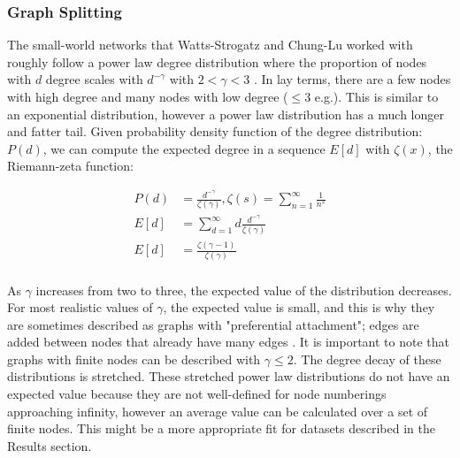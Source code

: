 \documentclass{article}
\begin{document}
\subsubsection{Graph Splitting}
The small-world networks that Watts-Strogatz and Chung-Lu worked with roughly follow a power law degree distribution where the proportion of nodes with $d$ degree scales with $d^{-\gamma}$ with $2 < \gamma < 3$ \cite{Chung:2004,Watts:1998}. In lay terms, there are a few nodes with high degree and many nodes with low degree ($\leq3$ e.g.). This is similar to an exponential distribution, however a power law distribution has a much longer and fatter tail. Given probability density function of the degree distribution: $P(d)$, we can compute the expected degree in a sequence $E[d]$ with $\zeta(x)$, the Riemann-zeta function:\\
\begin{spacing}{1}
\begin{align*}
P(d) & = \frac{d^{-\gamma}}{\zeta(\gamma)},               \zeta(s) = \sum_{n=1}^{\infty} \frac{1}{n^s}\\
E[d] & = \sum_{d=1}^{\infty} d \frac{d^{-\gamma}}{\zeta(\gamma)} \\
E[d] & = \frac{\zeta(\gamma-1)}{\zeta(\gamma)}\\ 
\end{align*}
\end{spacing}
As $\gamma$ increases from two to three, the expected value of the distribution decreases. For most realistic values of $\gamma$, the expected value is small, and this is why they are sometimes described as graphs with "preferential attachment"; edges are added between nodes that already have many edges \cite{Watts:1998}. It is important to note that graphs with finite nodes can be described with $\gamma \leq 2$. The degree decay of these distributions is stretched. These stretched power law distributions do not have an expected value because they are not well-defined for node numberings approaching infinity, however an average value can be calculated over a set of finite nodes. This might be a more appropriate fit for datasets described in the Results section.\\
\end{document}
